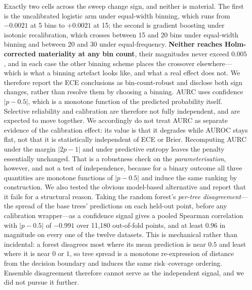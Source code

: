\documentclass[fleqn,10pt]{wlscirep}
\newcommand{\result}[1]{#1}
\begin{document}
Exactly two cells across the sweep change sign, and neither is material. The first is the
uncalibrated logistic arm under equal-width binning, which runs from \result{$-0.0021$} at
\result{5} bins to \result{$+0.0021$} at \result{15}; the second is gradient boosting under
isotonic recalibration, which crosses between \result{15} and \result{20} bins under equal-width
binning and between \result{20} and \result{30} under equal-frequency. \textbf{Neither reaches
Holm-corrected materiality at any bin count}, their magnitudes never exceed \result{$0.005$}, and
in each case the other binning scheme places the crossover elsewhere---which is what a
binning artefact looks like, and what a real effect does not. We therefore report the ECE
conclusions as bin-count-robust and disclose both sign changes, rather than resolve them by
choosing a binning.
AURC uses confidence $|p-0.5|$, which is a monotone function of the predicted probability
itself. Selective reliability and calibration are therefore not fully independent, and are expected
to move together. We accordingly do not treat AURC as separate evidence of the calibration effect:
its value is that it degrades while AUROC stays flat, not that it is statistically independent of
ECE or Brier. Recomputing AURC under the margin $|2p-1|$ and under predictive entropy leaves the
penalty essentially unchanged. That is a robustness check on the \emph{parameterisation}, however,
and not a test of independence, because for a binary outcome all three quantities are monotone
functions of $|p-0.5|$ and induce the same ranking by construction. We also tested the obvious
model-based alternative and report that it fails for a structural reason. Taking the random
forest's \emph{per-tree disagreement}---the spread of the base trees' predictions on each held-out
point, before any calibration wrapper---as a confidence signal gives a pooled Spearman correlation
with $|p-0.5|$ of \result{$-0.991$} over \result{11{,}180} out-of-fold points, and at least
\result{$0.96$} in magnitude on every one of the twelve datasets. This is mechanical rather than
incidental: a forest disagrees most where its mean prediction is near $0.5$ and least where it is
near $0$ or $1$, so tree spread is a monotone re-expression of distance from the decision boundary
and induces the same risk--coverage ordering. Ensemble disagreement therefore cannot serve as the
independent signal, and we did not pursue it further.
\end{document}
